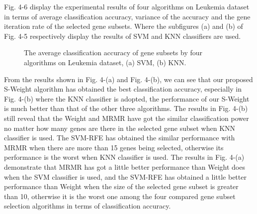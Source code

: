 \documentclass[runningheads,a4paper]{llncs}
\begin{document}
Fig. 4-6 display the experimental results of four algorithms on Leukemia dataset in terms of average classification accuracy, variance of the accuracy and the gene iteration rate of the selected gene subsets. Where the subfigures (a) and (b) of Fig. 4-5 respectively display the results of SVM and KNN classifiers are used.

\begin{figure}
\centering
{}
\hspace{0.5cm}
\caption{The average classification accuracy of gene subsets by four algorithms on Leukemia dataset, (a) SVM, (b) KNN.}
\label{fig:fig4}
\end{figure}

From the results shown in Fig. 4-(a) and Fig. 4-(b), we can see that our proposed S-Weight algorithm has obtained the best classification accuracy, especially in Fig. 4-(b) where the KNN classifier is adopted, the performance of our S-Weight is much better than that of the other three algorithms. The results in Fig. 4-(b) still reveal that the Weight and MRMR have got the similar classification power no matter how many genes are there in the selected gene subset when KNN classifier is used. The SVM-RFE has obtained the similar performance with MRMR when there are more than 15 genes being selected, otherwise its performance is the worst when KNN classifier is used. The results in Fig. 4-(a) demonstrate that MRMR has got a little better performance than Weight does when the SVM classifier is used, and the SVM-RFE has obtained a little better performance than Weight when the size of the selected gene subset is greater than 10, otherwise it is the worst one among the four compared gene subset selection algorithms in terms of classification accuracy.
\end{document}
